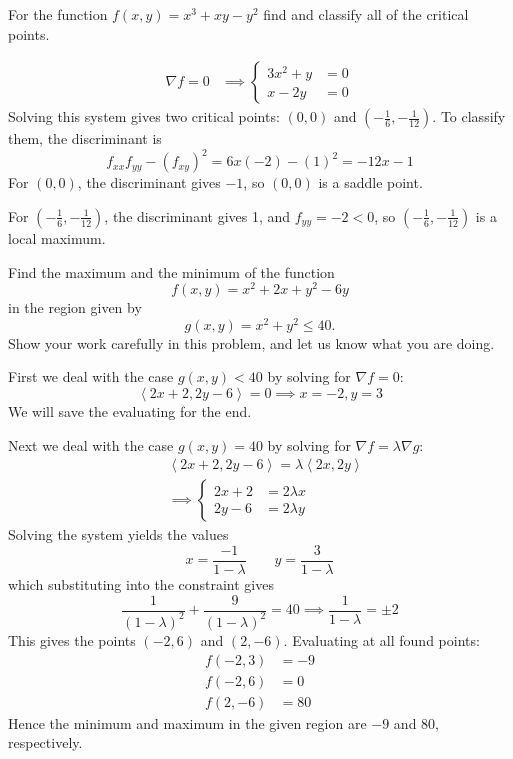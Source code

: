 \documentclass[12pt,answers]{exam}
\newcommand{\vect}[1]{\left\langle #1\right\rangle}
\begin{document}
\begin{questions}
	\newpage
	\question[14]
	For the function $f(x,y) = x^3 + xy - y^2$ find and classify all of the critical points.
	\begin{solution}
		\begin{align*}
			\nabla f = 0
			&\implies
			\left\{
				\begin{aligned}
					3x^2 + y &= 0\\ 
					x - 2y &= 0
				\end{aligned}
			\right.
		\end{align*}
		Solving this system gives two critical points: 
		$(0,0)$ and $(-\frac1{6}, -\frac1{12})$.
		To classify them, the discriminant is
		\[
			f_{xx} f_{yy} - (f_{xy})^2 
			= 6x(-2) - (1)^2 = -12x - 1
		\]
		For $(0,0)$, the discriminant gives $-1$, so $(0,0)$ is a saddle point.

		For $(-\frac16, -\frac1{12})$, the discriminant gives 1, and $f_{yy} = -2 < 0$, so $(-\frac16, -\frac1{12})$ is a local maximum.
	\end{solution}

	\newpage
	\question[20]
	Find the maximum and the minimum of the function
	\[
		f(x,y) = x^2 + 2x + y^2 - 6y
	\]
	in the region given by 
	\[
		g(x,y) = x^2 + y^2 \le 40.
	\]
	Show your work carefully in this problem, and let us know what you are doing.
	\begin{solution}
		First we deal with the case $g(x, y) < 40$ by solving for $\nabla f =0$:
		\[
			\vect{2x+2, 2y-6} = 0 \implies x=-2, y=3
		\]
		We will save the evaluating for the end.

		Next we deal with the case $g(x, y) = 40$ by solving for $\nabla f = \lambda \nabla g$:
		\[
			\begin{aligned}
			&\vect{2x+2, 2y-6} = \lambda \vect{2x, 2y} \\
			& \implies \left\{
				\begin{aligned}
					2x+2 &= 2\lambda x\\
					2y-6 &= 2\lambda y
				\end{aligned}
			\right.
			\end{aligned}
		\]
		Solving the system yields the values
		\[
			x = \frac{-1}{1-\lambda} \qquad y = \frac{3}{1-\lambda}
		\]
		which substituting into the constraint gives
		\[
			\frac{1}{(1-\lambda)^2} + \frac{9}{(1-\lambda)^2} = 40 \implies \frac{1}{1-\lambda} = \pm 2
		\]
		This gives the points $(-2, 6)$ and $(2, -6)$.
		Evaluating at all found points:
		\begin{align*}
			f(-2, 3) &= -9\\ 
			f(-2, 6) &= 0\\
			f(2, -6) &= 80 
		\end{align*}
		Hence the minimum and maximum in the given region are $-9$ and 80, respectively.
	\end{solution}


\end{questions}
\end{document}
